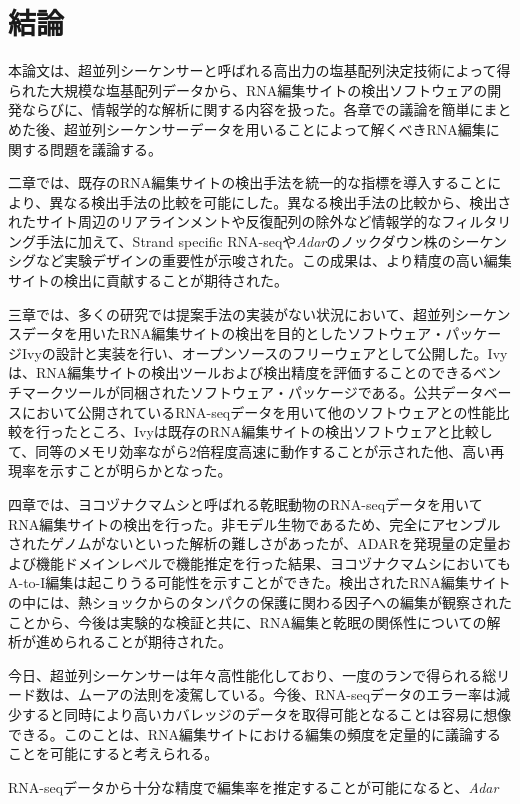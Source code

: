 \chapter{結論}
本論文は、超並列シーケンサーと呼ばれる高出力の塩基配列決定技術によって得られた大規模な塩基配列データから、RNA編集サイトの検出ソフトウェアの開発ならびに、情報学的な解析に関する内容を扱った。各章での議論を簡単にまとめた後、超並列シーケンサーデータを用いることによって解くべきRNA編集に関する問題を議論する。
\par
二章では、既存のRNA編集サイトの検出手法を統一的な指標を導入することにより、異なる検出手法の比較を可能にした。異なる検出手法の比較から、検出されたサイト周辺のリアラインメントや反復配列の除外など情報学的なフィルタリング手法に加えて、Strand specific RNA-seqや\textit{Adar}のノックダウン株のシーケンシグなど実験デザインの重要性が示唆された。この成果は、より精度の高い編集サイトの検出に貢献することが期待された。
\par
三章では、多くの研究では提案手法の実装がない状況において、超並列シーケンスデータを用いたRNA編集サイトの検出を目的としたソフトウェア・パッケージIvyの設計と実装を行い、オープンソースのフリーウェアとして公開した。Ivyは、RNA編集サイトの検出ツールおよび検出精度を評価することのできるベンチマークツールが同梱されたソフトウェア・パッケージである。公共データベースにおいて公開されているRNA-seqデータを用いて他のソフトウェアとの性能比較を行ったところ、Ivyは既存のRNA編集サイトの検出ソフトウェアと比較して、同等のメモリ効率ながら2倍程度高速に動作することが示された他、高い再現率を示すことが明らかとなった。
\par
四章では、ヨコヅナクマムシと呼ばれる乾眠動物のRNA-seqデータを用いてRNA編集サイトの検出を行った。非モデル生物であるため、完全にアセンブルされたゲノムがないといった解析の難しさがあったが、ADARを発現量の定量および機能ドメインレベルで機能推定を行った結果、ヨコヅナクマムシにおいてもA-to-I編集は起こりうる可能性を示すことができた。検出されたRNA編集サイトの中には、熱ショックからのタンパクの保護に関わる因子への編集が観察されたことから、今後は実験的な検証と共に、RNA編集と乾眠の関係性についての解析が進められることが期待された。\\
\par
今日、超並列シーケンサーは年々高性能化しており、一度のランで得られる総リード数は、ムーアの法則を凌駕している。今後、RNA-seqデータのエラー率は減少すると同時により高いカバレッジのデータを取得可能となることは容易に想像できる。このことは、RNA編集サイトにおける編集の頻度を定量的に議論することを可能にすると考えられる。
\par
RNA-seqデータから十分な精度で編集率を推定することが可能になると、\textit{Adar}
